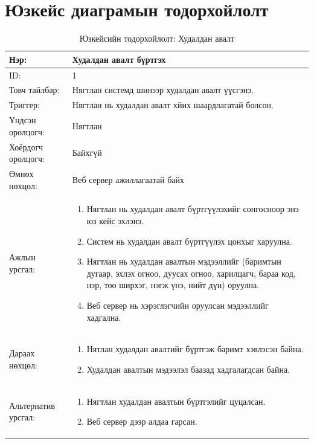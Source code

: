 \section{Юзкейс диаграмын тодорхойлолт}
\begin{center}
	\begin{table}[!htbp]
		\caption{Юзкейсийн тодорхойлолт: Худалдан авалт}
		\begin{tabular}{|p{4cm}|p{10cm}|}
			\hline
			Нэр: &   Худалдан авалт бүртгэх \\
			\hline
			ID: & 1 \\
			\hline
			Товч тайлбар: & Нягтлан системд шинээр худалдан авалт үүсгэнэ. \\
			\hline
			Триггер: & Нягтлан нь худалдан авалт хйих шаардлагатай болсон. \\
			\hline
			Үндсэн оролцогч: & Нягтлан \\
			\hline
			Хоёрдогч оролцогч: & Байхгүй  \\
			\hline
			Өмнөх нөхцөл: &  Веб сервер ажиллагаатай байх\\
			\hline
			Ажлын урсгал: & \begin{enumerate}
				\item Нягтлан нь худалдан авалт бүртгүүлэхийг сонгосноор энэ юз кейс эхлэнэ. 
				\item Систем нь худалдан авалт бүртгүүлэх цонхыг харуулна. 
				\item Нягтлан нь худалдан авалтын мэдээллийг (баримтын дугаар, эхлэх огноо, дуусах огноо, харилцагч, бараа код, нэр, тоо ширхэг, нэгж үнэ, нийт дүн) оруулна. 
				\item Веб сервер нь хэрэглэгчийн оруулсан мэдээллийг хадгална. 
				
				
			\end{enumerate}
			\\					  \hline
			Дараах нөхцөл: &
			\begin{enumerate}
				\item Нятлан худалдан авалтийг бүртгэж баримт хэвлэсэн байна. 
				\item Худалдан авалтын мэдээлэл баазад хадгалагдсан байна. 
			\end{enumerate}	   
			\\				   \hline
			Альтернатив урсгал: &  \begin{enumerate}
				\item Нягтлан худалдан авалтын бүртгэлийг цуцалсан.
				\item Веб сервер дээр алдаа гарсан. 
			\end{enumerate}
			\\	\hline
		\end{tabular}
	\end{table}
\end{center}


